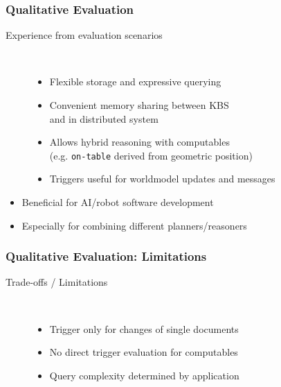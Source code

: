 \begin{frame}
  \frametitle{Qualitative Evaluation}
  \begin{description}
  \item[Experience from evaluation scenarios]%
                \hfill \\
    \begin{itemize}
    \item Flexible storage and expressive querying
    \item Convenient memory sharing between KBS\\ and in distributed system
    \item Allows hybrid reasoning with computables\\(e.g. \texttt{on-table} derived from geometric position)
    \item Triggers useful for worldmodel updates and messages
    \end{itemize}
  \end{description}
\begin{block}{}%
  \begin{itemize}
  \item Beneficial for AI/robot software development
  \item Especially for combining different planners/reasoners
  \end{itemize}
  \end{block}
\end{frame}

\begin{frame}
  \frametitle{Qualitative Evaluation: Limitations}
  \begin{description}
  \item[Trade-offs / Limitations]
                \hfill \\
\bigskip
    \begin{itemize}
    \item Trigger only for changes of single documents %
\vspace{0.15cm}
    \item No direct trigger evaluation for computables %
\vspace{0.15cm}
    \item Query complexity determined by application %
    \end{itemize}
  \end{description}
\end{frame}

